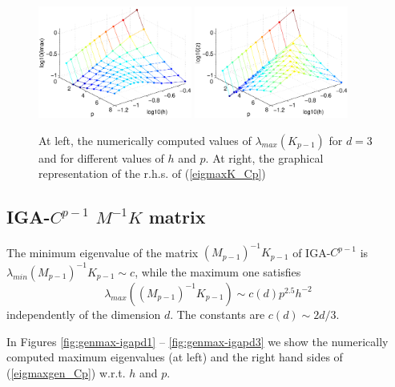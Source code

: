 \documentclass[11pt]{article}
\begin{document}
\begin{figure}
\begin{center}
\includegraphics[width=0.45\textwidth]{Images/igap_eigK3max.eps}\quad
\includegraphics[width=0.45\textwidth]{Images/igap_eigK3smax.eps}\\
\end{center}
\caption{At left, the numerically computed values of
$\lambda_{max}(K_{p-1})$ for $d=3$ and
for different values of $h$ and $p$. At right,
the graphical representation of the r.h.s. of (\ref{eigmaxK_Cp})}
\label{fig:stiffmax-igapd3}
\end{figure}

\clearpage
\newpage
\subsection{IGA-$C^{p-1}$ $M^{-1}K$ matrix}

The minimum eigenvalue of the
matrix $(M_{p-1})^{-1}K_{p-1}$ of IGA-$C^{p-1}$ is
 $\lambda_{min}(M_{p-1})^{-1}K_{p-1}\sim c$,
while the maximum one satisfies
\begin{equation} \label{eigmaxgen_Cp}
\lambda_{max}((M_{p-1})^{-1}K_{p-1})\sim c(d) p^{2.5}h^{-2}
\end{equation}
independently of the dimension $d$.
The constants are $c(d)\sim 2d/3$.

In Figures \ref{fig:genmax-igapd1} -- \ref{fig:genmax-igapd3} we show
the numerically computed maximum eigenvalues (at left) and the right hand sides of
(\ref{eigmaxgen_Cp}) w.r.t. $h$ and $p$.
\end{document}
